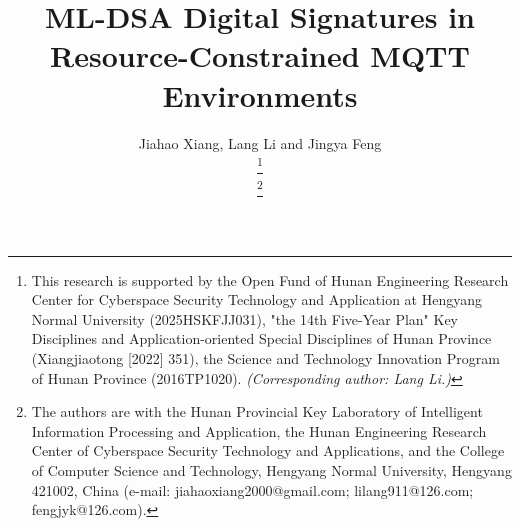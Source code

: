 \documentclass[final, twoside]{IEEEtran} %
\begin{document}
\title{ML-DSA Digital Signatures in Resource-Constrained MQTT Environments}

\author{ Jiahao Xiang, Lang Li  and Jingya Feng

	\thanks{This research is supported by the Open Fund of Hunan Engineering Research Center for Cyberspace Security Technology and Application at Hengyang Normal University (2025HSKFJJ031), "the 14th Five-Year Plan" Key Disciplines and Application-oriented Special Disciplines of Hunan Province (Xiangjiaotong [2022] 351), the Science and Technology Innovation Program of Hunan Province (2016TP1020). \textit{(Corresponding
			author: Lang Li.)}}

	\thanks{The authors are with the Hunan Provincial Key Laboratory of Intelligent Information Processing and Application, the Hunan Engineering Research Center of Cyberspace Security Technology and Applications, and the College of Computer Science and Technology, Hengyang Normal University, Hengyang 421002, China (e-mail: jiahaoxiang2000@gmail.com; lilang911@126.com; fengjyk@126.com).}

}


\maketitle
\end{document}
